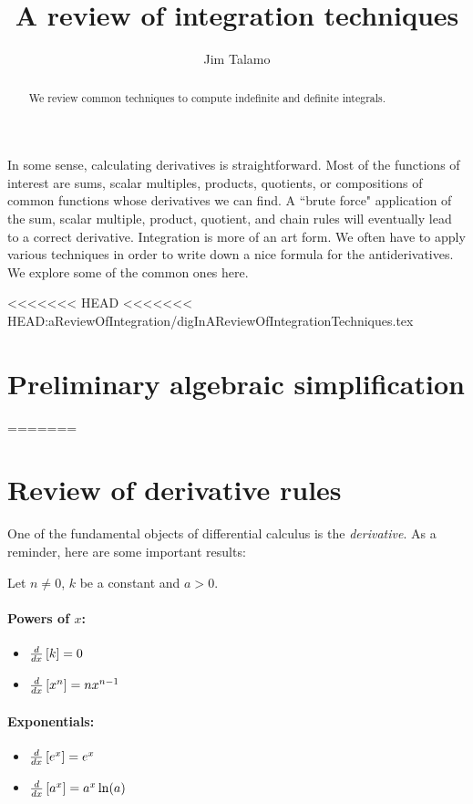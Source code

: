 \documentclass[nooutcomes]{ximera}
\author{Jim Talamo}
\title[Dig-In:]{A review of integration techniques}
\begin{document}
\begin{abstract}
  We review common techniques to compute indefinite and definite integrals.
\end{abstract}
\maketitle

In some sense, calculating derivatives is straightforward.  Most of the functions of interest are sums, scalar multiples, products, quotients, or compositions of common functions whose derivatives we can find.  A ``brute force" application of the sum, scalar multiple, product, quotient, and chain rules will eventually lead to a correct derivative.  Integration is more of an art form.  We often have to apply various techniques in order to write down a nice formula for the antiderivatives. We explore some of the common ones here.

<<<<<<< HEAD
<<<<<<< HEAD:aReviewOfIntegration/digInAReviewOfIntegrationTechniques.tex
\section{Preliminary algebraic simplification}
=======
\section{Review of derivative rules}

One of the fundamental objects of differential calculus is the \emph{derivative}.  As a reminder, here are some important results:

  Let $n\ne 0$, $k$ be a constant and $a>0$.


\paragraph{Powers of $x$:}
\begin{itemize}
\item $\frac{d}{\mathop{}\!d x} \left[ k \right] =0$
\item $\frac{d}{\mathop{}\!d x} \left[ x^n\right]  = n x^{n-1}$
\end{itemize}

\paragraph{Exponentials:}
\begin{itemize}
\item $\frac{d}{\mathop{}\!d x} \left[ e^x\right] = e^x$
\item $\frac{d}{\mathop{}\!d x} \left[ a^x \right]= a^x\ln(a)$
\end{itemize}
\end{document}
